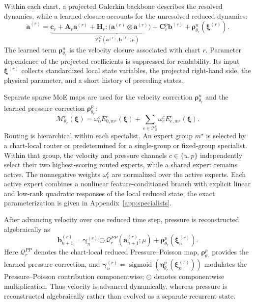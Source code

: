 \documentclass{article}
\providecommand{\DIFaddtex}[1]{{\protect\color{blue} \sf #1}} %
\providecommand{\DIFaddbegin}{} %
\providecommand{\DIFaddend}{} %
\providecommand{\DIFadd}[1]{\texorpdfstring{\DIFaddtex{#1}}{#1}} %
\providecommand{\DIFaddincludegraphics}[2][]{{\color{blue}\fbox{\DIFOincludegraphics[#1]{#2}}}} %
\DeclareRobustCommand{\DIFaddbegin}{\DIFOaddbegin \let\includegraphics\DIFaddincludegraphics} %
\DeclareRobustCommand{\DIFaddend}{\DIFOaddend \let\includegraphics\DIFOincludegraphics} %
\begin{document}
Within each chart, a projected Galerkin backbone describes the resolved dynamics, while a learned closure accounts for the unresolved reduced dynamics:
\begin{equation}
  \dot{\bm a}^{(r)}=
  \underbrace{\bm c_r+\bm A_r\bm a^{(r)}+
  \bm H_r:\bigl(\bm a^{(r)}\otimes\bm a^{(r)}\bigr)+
  \bm C^p_r\bm b^{(r)}}_{\mathcal F_r^{G}(\bm a^{(r)},\bm b^{(r)};\mu)}
  +\bm\rho^u_{\theta_r}(\bm\xi^{(r)}).
  \label{eq:main_specialist}
\end{equation}
The learned term $\bm\rho^u_{\theta_r}$ is the velocity closure associated with chart $r$. \DIFaddbegin \DIFadd{Parameter dependence of the projected coefficients is suppressed for readability. }\DIFaddend Its input $\bm\xi^{(r)}$ collects standardized local state variables, the projected right-hand side, the physical parameter, and a short history of preceding states.

Separate sparse MoE maps are used for the velocity correction $\bm\rho^u_{\theta_r}$ and the learned pressure correction $\bm\rho^p_{\theta_r}$:
\begin{equation}
  \mathcal M^c_{\theta_r}(\bm\xi)=
  \omega^c_0 E^c_{0,m^\star}(\bm\xi)+
  \sum_{e\in\mathcal T_2^c}\omega^c_e E^c_{e,m^\star}(\bm\xi).
  \label{eq:main_inner_moe}
\end{equation}
Routing is hierarchical within each specialist. An expert group $m^\star$ is selected by a chart-local router or predetermined for a single-group or fixed-group specialist. Within that group, the velocity and pressure channels $c\in\{u,p\}$ independently select their two highest-scoring routed experts, while a shared expert remains active. The nonnegative weights $\omega_e^c$ are normalized over the active experts. Each active expert combines a nonlinear feature-conditioned branch with explicit linear and low-rank quadratic responses of the local reduced state; the exact parameterization is given in Appendix~\ref{app:specialists}.

After advancing velocity over one reduced time step, pressure is reconstructed algebraically as
\begin{equation}
  \bm b_{n+1}^{(r)}
  =\bm\gamma_n^{(r)}\odot\mathcal Q_r^{PP}(\bm a_{n+1}^{(r)};\mu)
  +\bm\rho^p_{\theta_r}(\bm\xi_n^{(r)}).
  \label{eq:main_pressure_closure}
\end{equation}
Here $\mathcal Q_r^{PP}$ denotes the chart-local reduced Pressure--Poisson map, $\bm\rho^p_{\theta_r}$ provides the learned pressure correction, and $\bm\gamma_n^{(r)} =\operatorname{sigmoid}(\bm\eta^p_{\theta_r}(\bm\xi_n^{(r)}))$ modulates the Pressure--Poisson contribution componentwise; $\odot$ denotes componentwise multiplication. Thus velocity is advanced dynamically, whereas pressure is reconstructed algebraically rather than evolved as a separate recurrent state.
\end{document}
